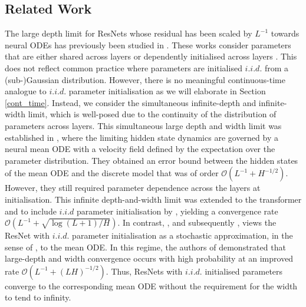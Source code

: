\documentclass{article}
\begin{document}
\subsection{Related Work}
The large depth limit for ResNets whose residual has been scaled by $L^{-1}$ towards neural ODEs has previously been studied in \cite{avelin2020neuralodesdeeplimit,  marion2024implicit}. These works consider parameters that are either shared across layers \cite{avelin2020neuralodesdeeplimit} or dependently initialised across layers \cite{marion2024implicit}.
This does not reflect common practice where parameters are initialised $i.i.d.$ from a (sub-)Gaussian distribution. However, there is no meaningful continuous-time analogue to $i.i.d.$ parameter initialisation as we will elaborate in Section \ref{cont_time}. 
Instead, we consider the simultaneous infinite-depth and infinite-width limit, which is well-posed due to the continuity of the distribution of parameters across layers. This simultaneous large depth and width limit was established in \cite{ding2}, where the limiting hidden state dynamics are governed by a neural mean ODE with a velocity field defined by the expectation over the parameter distribution. They obtained an error bound between the hidden states of the mean ODE and the discrete model that was of order $\mathcal O(L^{-1}+ H^{-1/2})$. However, they still required parameter dependence across the layers at initialisation. This infinite depth-and-width limit was extended to the transformer and to include $i.i.d$ parameter initialisation by \cite{gao2024global}, yielding a convergence rate $\mathcal O(L^{-1}+\sqrt{\log(L+1)/H})$.
In contrast, \cite{chizat2025hiddenwidthdeepresnets}, and subsequently \cite{chaintron2026resnets}, views the ResNet with $i.i.d.$ parameter initialisation as a stochastic approximation, in the sense of \cite{doi:10.1137/S0363012993253534}, to the mean ODE. In this regime, the authors of \cite{chizat2025hiddenwidthdeepresnets} demonstrated that large-depth and width convergence occurs with high probability at an improved rate $\mathcal O(L^{-1}+(LH)^{-1/2})$. Thus, ResNets with $i.i.d.$ initialised parameters converge to the corresponding mean ODE without the requirement for the width to tend to infinity.
\end{document}
